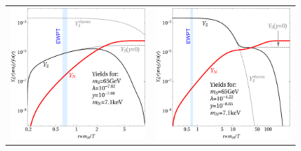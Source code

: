 \begin{figure}[t!]
\begin{tabular}{cc}
 \hspace{-1cm}\includegraphics[width=7.9cm]{figures/yield65FIMP.pdf} & \includegraphics[width=7.9cm]{figures/yield65WIMP.pdf}\\

\end{tabular}
\end{figure}
